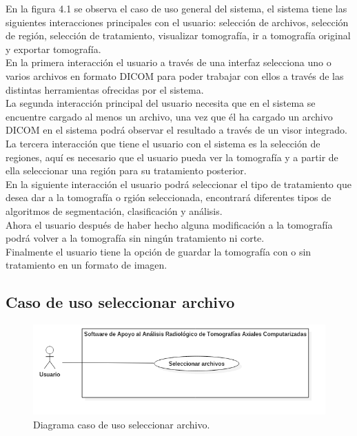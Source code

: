 \documentclass[12pt]{report}
\begin{document}
En la figura 4.1 se observa el caso de uso general del sistema, el sistema tiene  las siguientes interacciones principales con el usuario: selección de archivos, selección de región, selección de tratamiento, visualizar tomografía, ir a tomografía original y exportar tomografía.\\ 

En la primera interacción el usuario a través de una interfaz selecciona uno o varios archivos en formato DICOM para poder trabajar con ellos a través de las distintas herramientas ofrecidas por el sistema.\\

La segunda interacción principal del usuario necesita que en el sistema se encuentre cargado al menos un archivo, una vez que él ha cargado un archivo DICOM en el sistema podrá observar el resultado a través de un visor integrado.\\ 

La tercera interacción que tiene el usuario con el sistema es la selección de regiones, aquí es necesario que el usuario pueda ver la tomografía y a partir de ella seleccionar una región para su tratamiento posterior.\\

En la siguiente interacción el usuario podrá seleccionar el tipo de tratamiento que desea dar a la tomografía o rgión seleccionada, encontrará diferentes tipos de algoritmos de segmentación, clasificación y análisis.\\

Ahora el usuario después de haber hecho alguna modificación a la tomografía podrá volver a la tomografía sin ningún tratamiento ni corte.\\

Finalmente el usuario tiene la opción de guardar la tomografía con o sin tratamiento en un formato de imagen.


\subsection{Caso de uso seleccionar archivo}
\begin{figure}[H]
\centering
\includegraphics[width = 9 cm, height =  7 cm]{ArchivoCasos}
\caption{Diagrama caso de uso seleccionar archivo.}
\end{figure}
\end{document}
